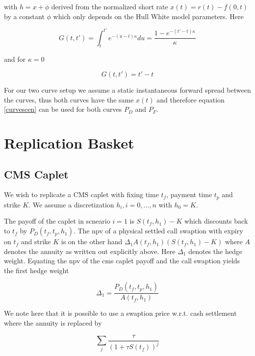\documentclass{amsart}
\theoremstyle{plain}
\numberwithin{equation}{section}
\begin{document}
with $h = x + \phi$ derived from the normalized short rate $x(t) = r(t)-f(0,t)$ by a constant $\phi$ which only depends on the Hull White model parameters. Here

\begin{equation}
G(t,t') = \int_t^{t'} e^{-(u-t)\kappa} du = \frac{1-e^{-(t'-t)\kappa}}{\kappa}
\end{equation}

and for $\kappa=0$

\begin{equation}
G(t,t') = t' - t
\end{equation}

For our two curve setup we assume a static instantaneous forward spread between the curves, thus both curves have the same $x(t)$ and therefore equation \ref{curvescen} can be used for both curves $P_D$ and $P_F$. 

\section{Replication Basket}

\subsection{CMS Caplet}

We wish to replicate a CMS caplet with fixing time $t_f$, payment time $t_p$ and strike $K$. We assume a discretization $h_i, i=0,...,n$ with $h_0=K$.

The payoff of the caplet in scneario $i=1$ is $S(t_f,h_1)-K$ which discounts back to $t_f$ by $P_D(t_f,t_p,h_1)$. The npv of a physical settled call swaption with expiry on $t_f$ and strike $K$ is on the other hand $\Delta_1A(t_f,h_1)(S(t_f,h_1)-K)$ where $A$ denotes the annuity as written out explicitly above. Here $\Delta_1$ denotes the hedge weight. Equating the npv of the cms caplet payoff and the call swaption yields the first hedge weight

\begin{equation}
\Delta_1 = \frac{P_D(t_f,t_p,h_1)}{A(t_f,h_1)}
\end{equation}

We note here that it is possible to use a swaption price w.r.t. cash settlement where the annuity is replaced by

\begin{equation}
\sum_j \frac{\tau}{(1+\tau S(t_f))^ j}
\end{equation}
\end{document}
